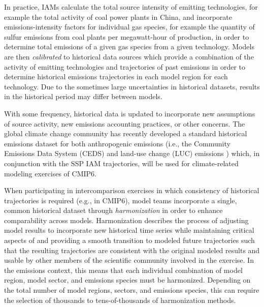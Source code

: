 In practice, IAMs calculate the total source intensity of emitting technologies,
for example the total activity of coal power plants in China, and incorporate
emissions-intensity factors for individual gas species, for example the quantity
of sulfur emissions from coal plants per megawatt-hour of production, in order
to determine total emissions of a given gas species from a given
technology. Models are then \textit{calibrated} to historical data sources which
provide a combination of the activity of emitting technologies and trajectories
of past emissions in order to determine historical emissions trajectories in
each model region for each technology. Due to the sometimes large uncertainties
in historical datasets, results in the historical period may differ between
models.

With some frequency, historical data is updated to incorporate new assumptions
of source activity, new emissions accounting practices, or other concerns. The
global climate change community has recently developed a standard historical
emissions dataset for both anthropogenic emissions (i.e., the Community
Emissions Data System (CEDS) \cite{hoesly_historical_2017} and land-use change
(LUC) emissions \cite{van_marle_historic_2017}) which, in
% 
% 
conjunction with the SSP IAM trajectories, will be used for climate-related
modeling exercises of CMIP6.

When participating in intercomparison exercises in which consistency of
historical trajectories is required (e.g., in CMIP6), model teams incorporate a
single, common historical dataset through \textit{harmonization} in order to
enhance comparability across models. Harmonization describes the process of
adjusting model results to incorporate new historical time series while
maintaining critical aspects of and providing a smooth transition to modeled
future trajectories such that the resulting trajectories are consistent with the
original modeled results and usable by other members of the scientific community
involved in the exercise. In the emissions context, this means that each
individual combination of model region, model sector, and emissions species must
be harmonized. Depending on the total number of model regions, sectors, and
emissions species, this can require the selection of thousands to
tens-of-thousands of harmonization methods.

